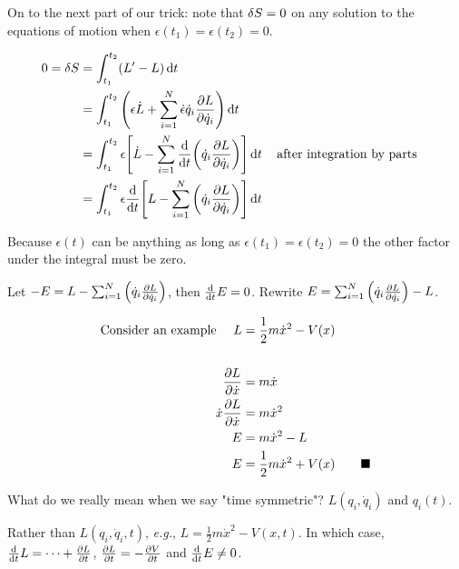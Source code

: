 \documentclass{article}
\begin{document}
On to the next part of our trick: note that $\var{S}=0$ on any solution to the equations of motion when $\epsilon(t_1)=\epsilon(t_2)=0$.

\begin{align*}
    0=\var{S} & =\int_{t_1}^{t_2}(L'-L)\dd{t}                                                                                                           \\
              & =\int_{t_1}^{t_2}\pqty{\epsilon \dot{L}+\sum_{i=1}^N \dot{\epsilon}  \dot{q}_i \pdv{L}{\dot{q}_i}}\dd{t}                                \\
              & =\int_{t_1}^{t_2}\epsilon\bqty{ \dot{L}-\sum_{i=1}^N \dv{t}\pqty{\dot{q}_i \pdv{L}{\dot{q}_i}}  }\dd{t} \qq{after integration by parts} \\
              & =\int_{t_1}^{t_2}\epsilon \dv{t}\bqty{ L-\sum_{i=1}^N\pqty{\dot{q}_i \pdv{L}{\dot{q}_i}}  }\dd{t}                                       \\
\end{align*}

Because $\epsilon(t)$ can be anything as long as $\epsilon(t_1)=\epsilon(t_2)=0$ the other factor under the integral must be zero.

Let $-E= L-\sum_{i=1}^N\pqty{\dot{q}_i \pdv{L}{\dot{q}_i}} $, then $\dv{t}E=0$. Rewrite $E= \sum_{i=1}^N\pqty{\dot{q}_i \pdv{L}{\dot{q}_i}}-L $.

\begin{align*}
    \qq*{Consider an example }L & =\frac{1}{2}m\dot{x}^2-V(x)                   \\                                                                                                           \\
    \pdv{L}{\dot{x}}            & =m\dot{x}                                     \\
    \dot{x}\pdv{L}{\dot{x}}     & =m\dot{x}^2                                   \\
    E                           & =m\dot{x}^2-L                                 \\
    E                           & =\frac{1}{2}m\dot{x}^2+V(x)\qquad\blacksquare \\
\end{align*}

What do we really mean when we say "time symmetric"? $L(q_i,\dot{q}_i)$ and $q_i(t)$.

Rather than $L(q_i,\dot{q}_i,t)$, \emph{e.g.}, $L=\frac{1}{2}m\dot{x}^2-V(x,t) $.
In which case, $\dv{t}L=\cdots+\pdv{L}{t}$, $\pdv{L}{t}=-\pdv{V}{t}$ and $\dv{t}E\neq 0$.
\end{document}
